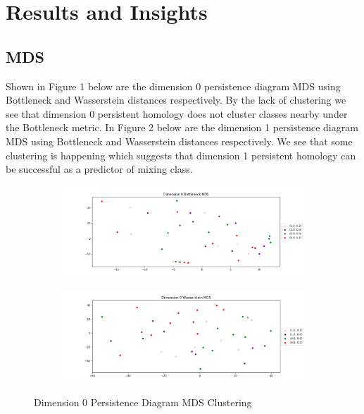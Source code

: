 \documentclass[12pt, fullpage,letterpaper]{article}
\theoremstyle{definition}
\begin{document}
	\section*{\normalfont Results and Insights}
	\subsection*{\normalfont MDS} 
	Shown in Figure 1 below are the dimension 0 persistence diagram MDS using Bottleneck and Wasserstein distances respectively. By the lack of clustering we see that dimension 0 persistent homology does not cluster classes nearby under the Bottleneck metric. In Figure 2 below are the dimension 1 persistence diagram MDS using Bottleneck and Wasserstein distances respectively. We see that some clustering is happening which suggests that dimension 1 persistent homology can be successful as a predictor of mixing class.
	\begin{figure}[ht!]
		\centering
		\begin{subfigure}
			\centering
			\includegraphics[scale = .5]{dim0mdsripserbott.png}

		\end{subfigure}
		\begin{subfigure}
			\centering
			\includegraphics[scale = .5]{dim0mdsripserwasser.png}
		\end{subfigure}
		\caption{Dimension 0 Persistence Diagram MDS Clustering}
	\end{figure}
\end{document}
